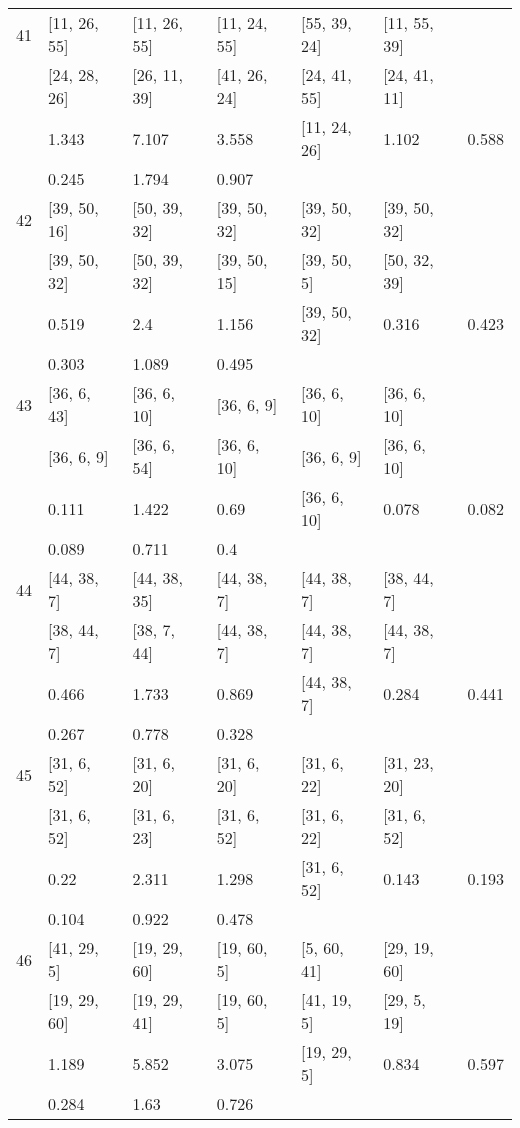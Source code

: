 \begin{longtable}{| l || l | l | l | l | l | l | }
\hline
41  & [11, 26, 55] & [11, 26, 55] & [11, 24, 55] & [55, 39, 24] & [11, 55, 39] \\
 & [24, 28, 26] & [26, 11, 39] & [41, 26, 24] & [24, 41, 55] & [24, 41, 11]\\
\hline
& 1.343 & 7.107 & 3.558 & [11, 24, 26] & 1.102 & 0.588\\
\hline
& 0.245 & 1.794 & 0.907 \\
\hline

\hline
42  & [39, 50, 16] & [50, 39, 32] & [39, 50, 32] & [39, 50, 32] & [39, 50, 32] \\
 & [39, 50, 32] & [50, 39, 32] & [39, 50, 15] & [39, 50, 5] & [50, 32, 39]\\
\hline
& 0.519 & 2.4 & 1.156 & [39, 50, 32] & 0.316 & 0.423\\
\hline
& 0.303 & 1.089 & 0.495 \\
\hline

\hline
43  & [36, 6, 43] & [36, 6, 10] & [36, 6, 9] & [36, 6, 10] & [36, 6, 10] \\
 & [36, 6, 9] & [36, 6, 54] & [36, 6, 10] & [36, 6, 9] & [36, 6, 10]\\
\hline
& 0.111 & 1.422 & 0.69 & [36, 6, 10] & 0.078 & 0.082\\
\hline
& 0.089 & 0.711 & 0.4 \\
\hline

\hline
44  & [44, 38, 7] & [44, 38, 35] & [44, 38, 7] & [44, 38, 7] & [38, 44, 7] \\
 & [38, 44, 7] & [38, 7, 44] & [44, 38, 7] & [44, 38, 7] & [44, 38, 7]\\
\hline
& 0.466 & 1.733 & 0.869 & [44, 38, 7] & 0.284 & 0.441\\
\hline
& 0.267 & 0.778 & 0.328 \\
\hline

\hline
45  & [31, 6, 52] & [31, 6, 20] & [31, 6, 20] & [31, 6, 22] & [31, 23, 20] \\
 & [31, 6, 52] & [31, 6, 23] & [31, 6, 52] & [31, 6, 22] & [31, 6, 52]\\
\hline
& 0.22 & 2.311 & 1.298 & [31, 6, 52] & 0.143 & 0.193\\
\hline
& 0.104 & 0.922 & 0.478 \\
\hline

\hline
46  & [41, 29, 5] & [19, 29, 60] & [19, 60, 5] & [5, 60, 41] & [29, 19, 60] \\
 & [19, 29, 60] & [19, 29, 41] & [19, 60, 5] & [41, 19, 5] & [29, 5, 19]\\
\hline
& 1.189 & 5.852 & 3.075 & [19, 29, 5] & 0.834 & 0.597\\
\hline
& 0.284 & 1.63 & 0.726 \\
\hline


\end{longtable}
